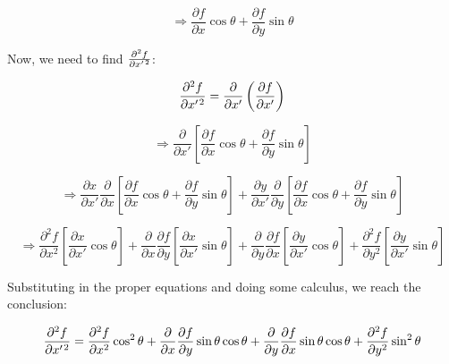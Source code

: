 \documentclass{article}
\begin{document}
\begin{enumerate}
\begin{equation}
\Rightarrow \frac{\partial f}{\partial x} \cos\theta  + \frac{\partial f}{\partial y} \sin\theta 
\end{equation}

Now, we need to find {\Large$\frac{\partial^2 f}{\partial x' \hspace{.2mm} ^2}$}:

\begin{equation}
\frac{\partial^2 f}{\partial x' \hspace{.2mm} ^2} = \frac{\partial}{\partial x'} \left( \frac{\partial f}{\partial x'} \right) 
\end{equation}

\begin{equation}
\Rightarrow \frac{\partial}{\partial x'} \left[ \frac{\partial f}{\partial x} \cos\theta + \frac{\partial f}{\partial y} \sin\theta \right]
\end{equation}

\begin{equation}
\Rightarrow \frac{\partial x}{\partial x'} \frac{\partial}{\partial x} \left[ \frac{\partial f}{\partial x} \cos\theta + \frac{\partial f}{\partial y} \sin\theta \right] +  \frac{\partial y}{\partial x'} \frac{\partial}{\partial y} \left[ \frac{\partial f}{\partial x} \cos\theta + \frac{\partial f}{\partial y}\sin\theta \right]
\end{equation}

\begin{equation}
\Rightarrow \frac{\partial ^2f}{\partial x^2} \left[ \frac{\partial x}{\partial x'} \cos\theta \right] + \frac{\partial}{\partial x} \frac{\partial f}{\partial y} \left[ \frac{\partial x}{\partial x'} \sin\theta \right] + \frac{\partial}{\partial y} \frac{\partial f}{\partial x} \left[ \frac{\partial y}{\partial x'} \cos\theta \right] +  \frac{\partial ^2f}{\partial y^2} \left[ \frac{\partial y}{\partial x'} \sin\theta \right]
\end{equation}

\bigbreak
Substituting in the proper equations and doing some calculus, we reach the conclusion:

\begin{equation}
\frac{\partial^2 f}{\partial x' \hspace{.2mm} ^2} = \frac{\partial ^2 f}{\partial x^2} \cos ^ 2 \theta  + \frac{\partial}{\partial x} \frac{\partial f}{\partial y} \sin\theta\cos\theta  + \frac{\partial}{\partial y} \frac{\partial f}{\partial x} \sin\theta\cos\theta  +  \frac{\partial ^2 f}{\partial y^2} \sin ^ 2 \theta
\end{equation}


\end{enumerate}
\end{document}
